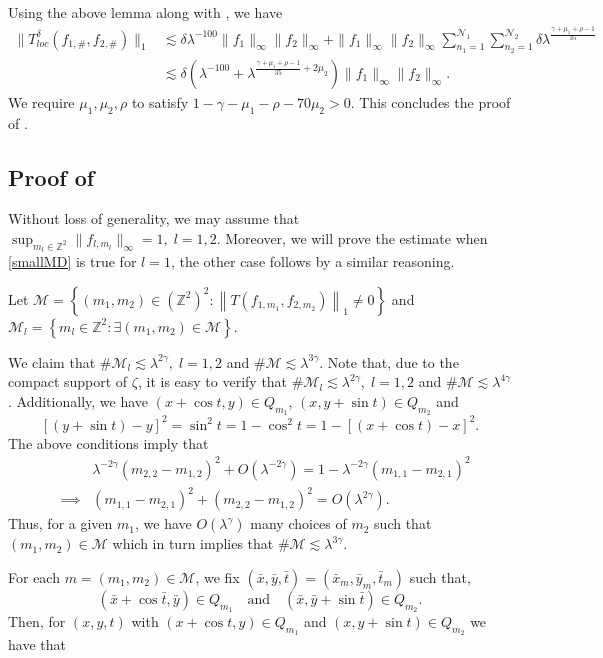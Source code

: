 \documentclass[a4paper,reqno]{amsart}
\theoremstyle{definition}
\theoremstyle{remark}
\numberwithin{equation}{section}
\newcommand{\Z}{{\mathbb Z}}
\begin{document}
	Using the above lemma along with , we have
	\begin{align*}
		\|T^\delta_{loc}(f_{1,\#},f_{2,\#})\|_1&\lesssim \delta\lambda^{-100}\|f_1\|_\infty\|f_2\|_\infty+\|f_1\|_\infty\|f_2\|_\infty\sum_{n_1=1}^{\mathcal{N}_1}\sum_{n_2=1}^{\mathcal{N}_2}\delta\lambda^{\frac{\gamma+\mu_1+\rho-1}{35}}\\
		&\lesssim\delta(\lambda^{-100}+\lambda^{\frac{\gamma+\mu_1+\rho-1}{35}+2\mu_2})\|f_1\|_\infty\|f_2\|_\infty.
	\end{align*}
	We require $\mu_1,\mu_2,\rho$ to satisfy ${1-\gamma-\mu_1-\rho}-70\mu_2>0$. This concludes the proof of .
	\subsection{Proof of }\label{sec:Oscillatory}
	Without loss of generality, we may assume that $\sup_{m_l\in\Z^2}\|f_{l,m_l}\|_\infty=1,\;l=1,2$. Moreover, we will prove the estimate when \eqref{smallMD} is true for $l=1$, the other case follows by a similar reasoning.
	
	Let $\mathcal M=\left\{\left(m_1, m_2\right) \in\left(\Z^2\right)^2:\left\|T\left(f_{1,m_1}, f_{2, m_2}\right)\right\|_1 \neq 0\right\}$ and\\ $\mathcal M_l=\left\{m_l \in \mathbb{Z}^2: \exists\left(m_1, m_2\right) \in \mathcal{M}\right\}$.
	
	We claim that $\# \mathcal M_l \lesssim \lambda^{2 \gamma},\;l=1,2$ and $\# \mathcal M \lesssim \lambda^{3 \gamma}$. Note that, due to the compact support of $\zeta$, it is easy to verify that $\# \mathcal M_l \lesssim \lambda^{2 \gamma},\;l=1,2$ and $\# \mathcal M \lesssim \lambda^{4 \gamma}$. Additionally, we have $(x+\cos t,y)\in Q_{m_1}$, $(x,y+\sin t)\in Q_{m_2}$ and
	\[[(y+\sin t)-y]^2=\sin^2t=1-\cos^2t=1-[(x+\cos t)-x]^2.\]
	The above conditions imply that
	\begin{eqnarray*}
		&&\lambda^{-2\gamma}(m_{2,2}-m_{1,2})^2+O(\lambda^{-2\gamma})=1-\lambda^{-2\gamma}(m_{1,1}-m_{2,1})^2\\
		&\implies& (m_{1,1}-m_{2,1})^2+(m_{2,2}-m_{1,2})^2=O(\lambda^{2\gamma}).
	\end{eqnarray*}
	Thus, for a given $m_1$, we have $O(\lambda^{\gamma})$ many choices of $m_2$ such that $(m_1,m_2)\in\mathcal{M}$ which in turn implies that $\# \mathcal M \lesssim \lambda^{3 \gamma}$.
	
	For each ${m}=\left(m_1, m_2\right) \in \mathcal{M}$, we fix $(\bar{x}, \bar{y}, \bar{t})=\left(\bar{x}_{{m}}, \bar{y}_{{m}}, \bar{t}_{{m}}\right)$ such that,
	\[
	(\bar{x}+\cos \bar{t}, \bar{y}) \in Q_{m_1} \quad \text{and} \quad(\bar{x}, \bar{y}+\sin \bar{t}) \in Q_{m_2}.
	\]
	Then, for $(x, y, t)$ with $(x+\cos t, y)\in Q_{m_1}$ and $(x, y+\sin t)\in Q_{m_2}$ we have that 
	
\end{document}
